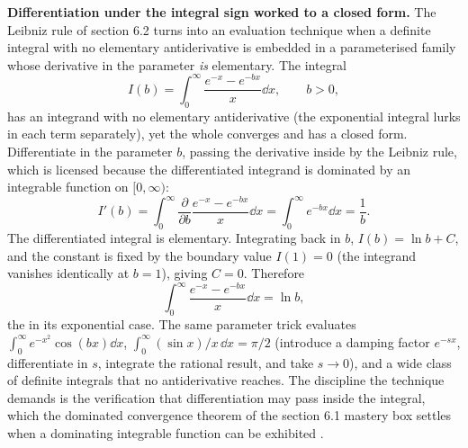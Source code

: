 \begin{mastery}
\textbf{Differentiation under the integral sign worked to a closed
form.} The Leibniz rule of section 6.2 turns into an evaluation
technique when a definite integral with no elementary antiderivative
is embedded in a parameterised family whose derivative in the
parameter \emph{is} elementary. The integral
\[
I(b) = \int_{0}^{\infty}\frac{e^{-x} - e^{-bx}}{x}\dd x, \qquad b > 0,
\]
has an integrand with no elementary antiderivative (the exponential
integral lurks in each term separately), yet the whole converges and
has a closed form. Differentiate in the parameter $b$, passing the
derivative inside by the Leibniz rule, which is licensed because the
differentiated integrand is dominated by an integrable function on
$[0, \infty)$:
\[
I'(b) = \int_{0}^{\infty}\frac{\partial}{\partial b}
\frac{e^{-x} - e^{-bx}}{x}\dd x
= \int_{0}^{\infty} e^{-bx}\dd x = \frac{1}{b}.
\]
The differentiated integral is elementary. Integrating back in $b$,
$I(b) = \ln b + C$, and the constant is fixed by the boundary value
$I(1) = 0$ (the integrand vanishes identically at $b = 1$), giving
$C = 0$. Therefore
\[
\int_{0}^{\infty}\frac{e^{-x} - e^{-bx}}{x}\dd x = \ln b,
\]
the  in its exponential case. The same
parameter trick evaluates $\int_{0}^{\infty} e^{-x^{2}}\cos(bx)\dd x$,
$\int_{0}^{\infty}(\sin x)/x\,\dd x = \pi/2$ (introduce a damping
factor $e^{-sx}$, differentiate in $s$, integrate the rational result,
and take $s \to 0$), and a wide class of definite integrals that no
antiderivative reaches. The discipline the technique demands is the
verification that differentiation may pass inside the integral, which
the dominated convergence theorem of the section 6.1 mastery box
settles when a dominating integrable function can be exhibited
\cite{text:v2ch06-apostol-calculus}.
\end{mastery}

